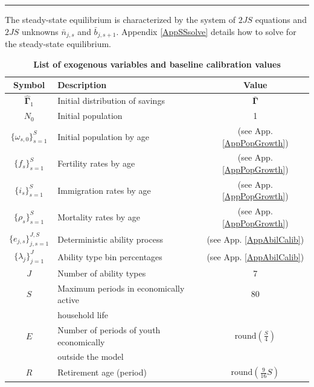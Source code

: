     \hrule
    \begin{spacing}{1.5}
    \vspace{10mm}

    The steady-state equilibrium is characterized by the system of $2JS$ equations and $2JS$ unknowns $\bar{n}_{j,s}$ and $\bar{b}_{j,s+1}$. Appendix \ref{AppSSsolve} details how to solve for the steady-state equilibrium.

    \begin{table}[htbp] \centering \captionsetup{width=4.7in}
    \caption{\label{TabExogVars}\textbf{List of exogenous variables and baseline calibration values}}
      \begin{threeparttable}
      \begin{tabular}{>{\footnotesize}c |>{\footnotesize}l |>{\footnotesize}c}
        \hline\hline
        Symbol & \quad\quad\quad\quad Description & Value \\
        \hline
        $\bm{\hat{\Gamma}}_1$ & Initial distribution of savings & $\bm{\bar{\Gamma}}$ \\
        $N_0$ & Initial population & 1 \\
        $\{\omega_{s,0}\}_{s=1}^S$ & Initial population by age & (see App. \ref{AppPopGrowth}) \\
        $\{f_s\}_{s=1}^S$ & Fertility rates by age & (see App. \ref{AppPopGrowth}) \\
        $\{i_s\}_{s=1}^S$ & Immigration rates by age & (see App. \ref{AppPopGrowth}) \\
        $\{\rho_s\}_{s=1}^S$ & Mortality rates by age & (see App. \ref{AppPopGrowth}) \\
        $\{e_{j,s}\}_{j,s=1}^{J,S}$ & Deterministic ability process & (see App. \ref{AppAbilCalib}) \\
        $\{\lambda_j\}_{j=1}^J$ & Ability type bin percentages & (see App. \ref{AppAbilCalib}) \\
        $J$ & Number of ability types & 7 \\
        $S$ & Maximum periods in economically active & 80 \\[-2mm]
        &\quad household life & \\
        $E$ & Number of periods of youth economically & $\text{round}\left(\frac{S}{4}\right)$ \\[-2mm]
        & \quad outside the model & \\
        $R$ & Retirement age (period) & $\text{round}\left(\frac{9}{16}S\right)$ \\
        \hline

\end{tabular}
\end{threeparttable}
\end{table}
\end{spacing}
